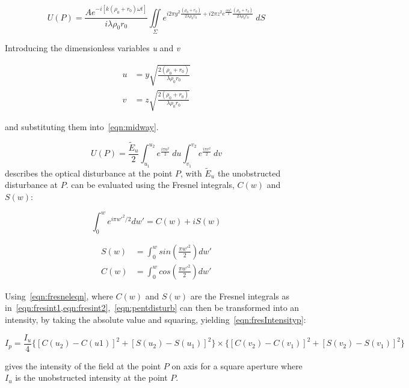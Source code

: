 \begin{equation}
U(P)=\frac{Ae^{-i[k(\rho_0+r_0)\omega t]}}{i\lambda\rho_0r_0}\iint\limits_{\Sigma} e^{i2\pi y^2\tfrac{(\rho_0+r_0)}{2\lambda\rho_0r_0}+i2\pi z^2e^{\frac{i\pi u^2}{2}}\tfrac{(\rho_0+r_0)}{2\lambda\rho_0r_0}} \ dS
\label{eqn:midway}
\end{equation}


Introducing the dimensionless variables \textit{u} and \textit{v}

\begin{align}
u&=y\sqrt{\frac{2(\rho_0+r_0)}{\lambda\rho_0r_0}}\\
v&=z\sqrt{\frac{2(\rho_0+r_0)}{\lambda\rho_0r_0}}
\end{align}

and substituting them into~\cref{eqn:midway}.

\begin{equation}
U(P)=\frac{\tilde{E}_u}{2}\int_{u_1}^{u_2} e^{\tfrac{i\pi u^2}{2}}\ du\int_{v_1}^{v_2} e^{\tfrac{i\pi v^2}{2}} \ dv
\label{eqn:pentdisturb}
\end{equation}
 describes the optical disturbance at the point $P$, with $\tilde{E}_u$ the unobstructed disturbance at $P$.
 can be evaluated using the Fresnel integrals, $C(w)$ and $S(w)$:


\begin{equation}
\int_{0}^{w}e^{i\pi w'^2/2}dw'=C(w)+iS(w)
\label{eqn:fresneleqn}
\end{equation}


\begin{align}
S(w)&=\int^w_0 sin\left(\frac{\pi w'^2}{2}\right)dw'\label{eqn:fresint1}\\
C(w)&=\int^w_0 cos\left(\frac{\pi w'^2}{2}\right)dw'\label{eqn:fresint2}
\end{align}


Using~\cref{eqn:fresneleqn}, where $C(w)$ and $S(w)$ are the Fresnel integrals as in~\cref{eqn:fresint1,eqn:fresint2},~\cref{eqn:pentdisturb} can then be transformed into an intensity, by taking the absolute value and squaring, yielding~\cref{eqn:fresIntensityp}:


\begin{equation}
I_p = \frac{I_u}{4} \{[C(u_2) - C(u1)]^2 + [S(u_2) - S(u_1)]^2\} \times \{[C(v_2) - C(v_1)]^2 + [S(v_2) - S(v_1)]^2\}
\label{eqn:fresIntensityp}
\end{equation}

 gives the intensity of the field at the point $P$ on axis for a square aperture where $I_u$ is the unobstructed intensity at the point $P$. 

